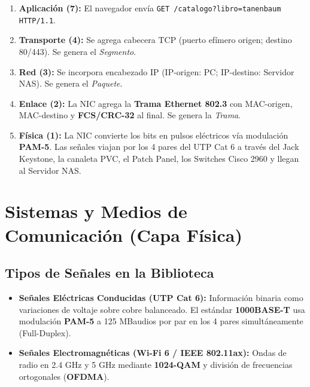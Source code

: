 \documentclass[12pt,a4paper]{article}
\begin{document}
\begin{enumerate}[leftmargin=1.8em,itemsep=3pt]
  \item \textbf{Aplicación (7):} El navegador envía \texttt{GET /catalogo?libro=tanenbaum HTTP/1.1}.
  \item \textbf{Transporte (4):} Se agrega cabecera TCP (puerto efímero origen; destino 80/443). Se genera el \textit{Segmento}.
  \item \textbf{Red (3):} Se incorpora encabezado IP (IP-origen: PC; IP-destino: Servidor NAS). Se genera el \textit{Paquete}.
  \item \textbf{Enlace (2):} La NIC agrega la \textbf{Trama Ethernet 802.3} con MAC-origen, MAC-destino y \textbf{FCS/CRC-32} al final. Se genera la \textit{Trama}.
  \item \textbf{Física (1):} La NIC convierte los bits en pulsos eléctricos vía modulación \textbf{PAM-5}. Las señales viajan por los 4 pares del UTP Cat 6 a través del Jack Keystone, la canaleta PVC, el Patch Panel, los Switches Cisco 2960 y llegan al Servidor NAS.
\end{enumerate}

\section{Sistemas y Medios de Comunicación (Capa Física)}

\subsection{Tipos de Señales en la Biblioteca}
\begin{itemize}[leftmargin=1.5em,itemsep=3pt]
  \item \textbf{Señales Eléctricas Conducidas (UTP Cat 6):} Información binaria como variaciones de voltaje sobre cobre balanceado. El estándar \textbf{1000BASE-T} usa modulación \textbf{PAM-5} a 125 MBaudios por par en los 4 pares simultáneamente (Full-Duplex).
  \item \textbf{Señales Electromagnéticas (Wi-Fi 6 / IEEE 802.11ax):} Ondas de radio en 2.4 GHz y 5 GHz mediante \textbf{1024-QAM} y división de frecuencias ortogonales (\textbf{OFDMA}).
\end{itemize}
\end{document}
